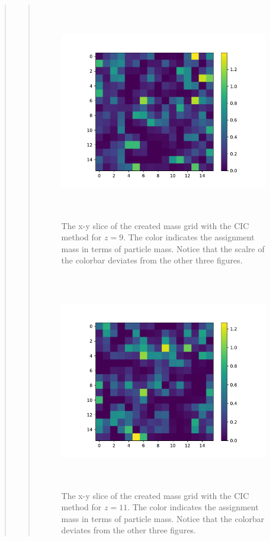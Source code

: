 \begin{quote}
\begin{quote}
\begin{figure}[!ht]
\centering
\includegraphics[width=14cm, height=9.5cm]{./Plots/5c_slice_9.pdf}
\caption{The x-y slice of the created mass grid with the CIC method for $z = 9$. The color indicates the assignment mass in terms of particle mass. Notice that the scalre of the colorbar deviates from the other three figures.}
\end{figure}

\newpage
\begin{figure}[!ht]
\centering
\includegraphics[width=14cm, height=9.5cm]{./Plots/5c_slice_11.pdf}
\caption{The x-y slice of the created mass grid with the CIC method for $z = 11$. The color indicates the assignment mass in terms of particle mass. Notice that the colorbar deviates from the other three figures. }
\end{figure}



\end{quote}
\end{quote}
